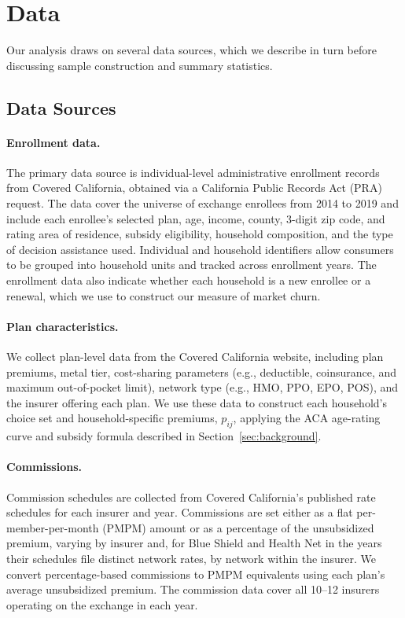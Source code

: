 \documentclass[12pt]{article}
\begin{document}
\section{Data}
\label{sec:data}

Our analysis draws on several data sources, which we describe in turn before discussing sample construction and summary statistics.

\subsection{Data Sources}

\paragraph{Enrollment data.} The primary data source is individual-level administrative enrollment records from Covered California, obtained via a California Public Records Act (PRA) request. The data cover the universe of exchange enrollees from 2014 to 2019 and include each enrollee's selected plan, age, income, county, 3-digit zip code, and rating area of residence, subsidy eligibility, household composition, and the type of decision assistance used. Individual and household identifiers allow consumers to be grouped into household units and tracked across enrollment years. The enrollment data also indicate whether each household is a new enrollee or a renewal, which we use to construct our measure of market churn.


\paragraph{Plan characteristics.} We collect plan-level data from the Covered California website, including plan premiums, metal tier, cost-sharing parameters (e.g., deductible, coinsurance, and maximum out-of-pocket limit), network type (e.g., HMO, PPO, EPO, POS), and the insurer offering each plan. We use these data to construct each household's choice set and household-specific premiums, $p_{ij}$, applying the ACA age-rating curve and subsidy formula described in Section~\ref{sec:background}.

\paragraph{Commissions.} Commission schedules are collected from Covered California's published rate schedules for each insurer and year. Commissions are set either as a flat per-member-per-month (PMPM) amount or as a percentage of the unsubsidized premium, varying by insurer and, for Blue Shield and Health Net in the years their schedules file distinct network rates, by network within the insurer. We convert percentage-based commissions to PMPM equivalents using each plan's average unsubsidized premium. The commission data cover all 10--12 insurers operating on the exchange in each year.
\end{document}
